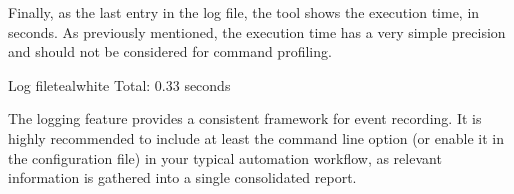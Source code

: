 Finally, as the last entry in the log file, the tool shows the execution time, in seconds. As previously mentioned, the execution time has a very simple precision and should not be considered for command profiling.

\begin{codebox}{Log file}{teal}{\icnote}{white}
Total: 0.33 seconds
\end{codebox}

The logging feature provides a consistent framework for event recording. It is highly recommended to include at least the  command line option (or enable it in the configuration file) in your typical automation workflow, as relevant information is gathered into a single consolidated report.
